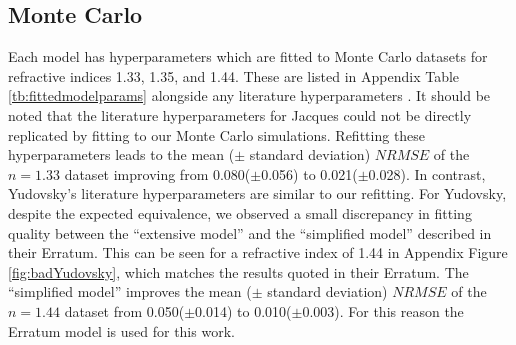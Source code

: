 \subsection{Monte Carlo}\label{sec:resultsMC}
Each model has hyperparameters which are fitted to Monte Carlo datasets for refractive indices 1.33, 1.35, and 1.44. These are listed in Appendix Table \ref{tb:fittedmodelparams} alongside any literature hyperparameters \cite{Jacques1999, Yudovsky2009}. It should be noted that the literature hyperparameters for Jacques could not be
directly
replicated by fitting to our Monte Carlo simulations. 
Refitting these hyperparameters leads to the mean ($\pm$ standard deviation) $NRMSE$ of the $n=1.33$ dataset improving from 0.080($\pm$0.056) to 0.021($\pm$0.028). 
In contrast, Yudovsky's literature hyperparameters are similar to our refitting.
For Yudovsky, despite the expected equivalence, we observed a small discrepancy in fitting quality between the ``extensive model'' \cite{Yudovsky2009} and the ``simplified model'' described in their Erratum\cite{Yudovsky2015}.
This can be seen for a refractive index of 1.44 in Appendix Figure \ref{fig:badYudovsky}, which matches the results quoted in their Erratum\cite{Yudovsky2015}.
The ``simplified model'' improves the mean ($\pm$ standard deviation) $NRMSE$ of the $n=1.44$ dataset from 0.050($\pm$0.014) to 0.010($\pm$0.003).
For this reason the Erratum model is used for this work. 

